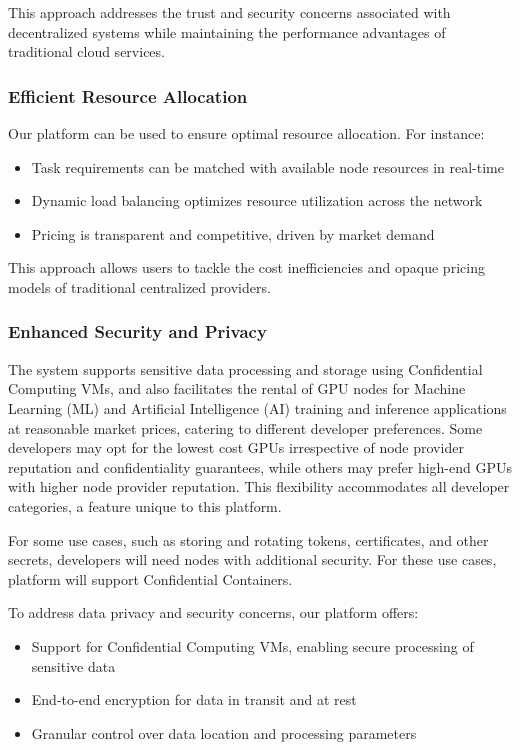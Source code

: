 This approach addresses the trust and security concerns associated with decentralized systems while maintaining the performance advantages of traditional cloud services.

\subsubsection{Efficient Resource Allocation}
Our platform can be used to ensure optimal resource allocation. For instance:
\begin{itemize}
    \item Task requirements can be matched with available node resources in real-time
    \item Dynamic load balancing optimizes resource utilization across the network
    \item Pricing is transparent and competitive, driven by market demand
\end{itemize}

This approach allows users to tackle the cost inefficiencies and opaque pricing models of traditional centralized providers.

\subsubsection{Enhanced Security and Privacy}

The system supports sensitive data processing and storage using Confidential Computing VMs, and also facilitates the rental of GPU nodes for Machine Learning (ML) and Artificial Intelligence (AI) training and inference applications at reasonable market prices, catering to different developer preferences. Some developers may opt for the lowest cost GPUs irrespective of node provider reputation and confidentiality guarantees, while others may prefer high-end GPUs with higher node provider reputation. This flexibility accommodates all developer categories, a feature unique to this platform.

For some use cases, such as storing and rotating tokens, certificates, and other secrets, developers will need nodes with additional security. For these use cases, platform will support Confidential Containers\cite{brasser2022trusted}.

To address data privacy and security concerns, our platform offers:
\begin{itemize}
    \item Support for Confidential Computing VMs, enabling secure processing of sensitive data
    \item End-to-end encryption for data in transit and at rest
    \item Granular control over data location and processing parameters
\end{itemize}

